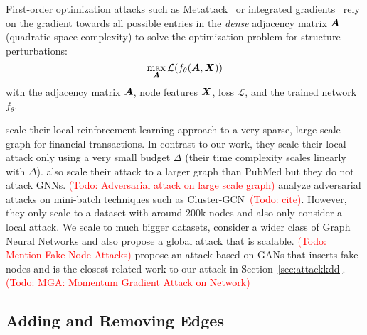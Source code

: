 \documentclass[sigconf,authordraft]{acmart}
\newcommand{\adj}{\mA}
\newcommand{\features}{\mX}
\newcommand{\todo}[1]{\textcolor{red}{(Todo: #1)}}
\begin{document}
First-order optimization attacks such as Metattack~\citep{Zugner2019a} or integrated gradients~\citep{Wu2019} rely on the gradient towards all possible entries in the \textit{dense} adjacency matrix \(\adj\) (quadratic space complexity) to solve the optimization problem for structure perturbations:
\begin{equation}\label{eq:attack}
  \max_{\adj} \mathcal{L}(f_{\theta}(\adj, \features))
\end{equation}
with the adjacency matrix \(\adj\), node features \(\features\), loss \(\mathcal{L}\), and the trained network \(f_{\theta}\).

\citet{Dai2018} scale their local reinforcement learning approach to a very sparse, large-scale graph for financial transactions. In contrast to our work, they scale their local attack only using a very small budget \(\Delta\) (their time complexity scales linearly with \(\Delta\)). \citet{Wang2019} also scale their attack to a larger graph than PubMed but they do not attack GNNs. \todo{Adversarial attack on large scale graph} analyze adversarial attacks on mini-batch techniques such as Cluster-GCN~\todo{cite}. However, they only scale to a dataset with around 200k nodes and also only consider a local attack. We scale to much bigger datasets, consider a wider class of Graph Neural Networks and also propose a global attack that is scalable. \todo{Mention Fake Node Attacks} propose an attack based on GANs that inserts fake nodes and is the closest related work to our attack in Section~\ref{sec:attackkdd}.
\todo{MGA: Momentum Gradient Attack on Network}

\subsection{Adding and Removing Edges}\label{sec:prbcd}
\end{document}

